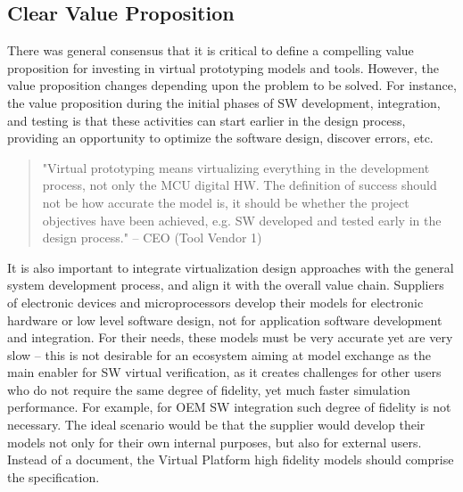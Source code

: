 
\subsection{Clear Value Proposition}
There was general consensus that it is critical to define a compelling value proposition for investing in virtual prototyping models and tools. However, the value proposition changes depending upon the problem to be solved. For instance, the value proposition during the initial phases of SW development, integration, and testing is that these activities can start earlier in the design process, providing an opportunity to optimize the software design, discover errors, etc.

\begin{quote}
"Virtual prototyping means virtualizing everything in the development process, not only the MCU digital HW. The definition of success should not be how accurate the model is, it should be whether the project objectives have been achieved, e.g. SW developed and tested early in the design process."
-- CEO (Tool Vendor 1)
\end{quote}

It is also important to integrate virtualization design approaches with the general system development process, and align it with the overall value chain.
Suppliers of electronic devices and microprocessors develop their models for electronic hardware or low level software design, not for application software development and integration.
For their needs, these models must be very accurate yet are very slow -- this is not desirable for an ecosystem aiming at model exchange as the main enabler for SW virtual verification,
as it creates challenges for other users who do not require the same degree of fidelity, yet much faster simulation performance.
For example, for OEM SW integration such degree of fidelity is not necessary. 
The ideal scenario would be that the supplier would develop their models not only for their own internal purposes, but also for external users.
Instead of a document,
the Virtual Platform high fidelity models should comprise the specification. 

